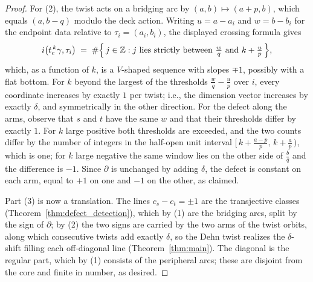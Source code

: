 \documentclass[10pt,a4paper]{amsart}
\newcommand{\ZZ}{\mathbb{Z}}
\begin{document}
\begin{proof}
For (2), the twist acts on a bridging arc by $(a, b) \mapsto (a + p, b)$,
which equals $(a, b - q)$ modulo the deck action. Writing $u = a - a_i$
and $w = b - b_i$ for the endpoint data relative to $\tau_i = (a_i,
b_i)$, the displayed crossing formula gives
\[
  i\bigl(t_c^{\,k}\gamma, \tau_i\bigr)
  \;=\; \#\Bigl\{\, j \in \ZZ :
  j \text{ lies strictly between } \tfrac{w}{q} \text{ and }
  k + \tfrac{u}{p} \,\Bigr\},
\]
which, as a function of $k$, is a $V$-shaped sequence with slopes
$\mp 1$, possibly with a flat bottom. For $k$ beyond the largest of the
thresholds $\frac{w}{q} - \frac{u}{p}$ over $i$, every coordinate
increases by exactly $1$ per twist; i.e., the dimension vector increases
by exactly $\delta$, and symmetrically in the other direction. For the
defect along the arms, observe that $s$ and $t$ have the same $w$ and
that their thresholds differ by exactly $1$. For $k$ large positive both
thresholds are exceeded, and the two counts differ by the number of
integers in the half-open unit interval
$[\,k + \frac{a - p}{p},\, k + \frac{a}{p}\,)$, which is one; for $k$
large negative the same window lies on the other side of $\frac{b}{q}$
and the difference is $-1$. Since $\partial$ is unchanged by adding
$\delta$, the defect is constant on each arm, equal to $+1$ on one and
$-1$ on the other, as claimed.

Part (3) is now a translation. The lines $c_s - c_t = \pm 1$ are the
transjective classes \textup{(}Theorem~\ref{thm:defect_detection}\textup{)},
which by (1) are the bridging arcs, split by the sign of $\partial$; by
(2) the two signs are carried by the two arms of the twist orbits, along
which consecutive twists add exactly $\delta$, so the Dehn twist realizes
the $\delta$-shift filling each off-diagonal line
\textup{(}Theorem~\ref{thm:main}\textup{)}. The diagonal is the regular
part, which by (1) consists of the peripheral arcs; these are disjoint
from the core and finite in number, as desired.
\end{proof}
\end{document}
